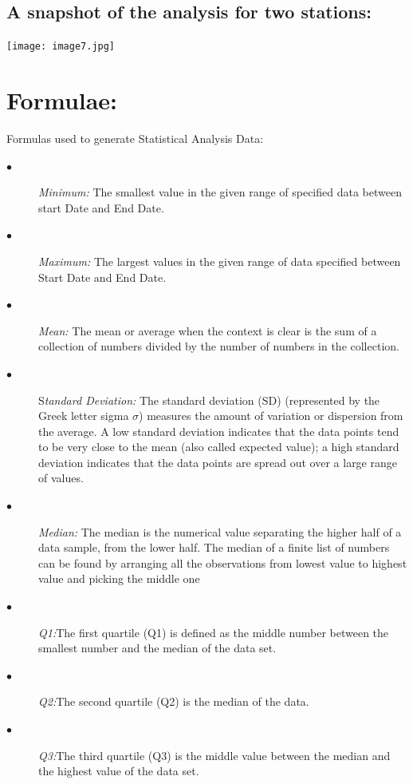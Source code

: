 \documentclass[a4paper]{article}
\begin{document}
\subsection*{A snapshot of the analysis for two stations:}
\begin{center}
\texttt{[image: image7.jpg]}
\end{center}
\begin{minipage}[t]{0.45\textwidth}
\bigskip
\section*{Formulae:}
{\normalsize Formulas used to generate Statistical Analysis Data:
\begin{description}
  \item[$\bullet$ ] \textit{Minimum: }The smallest value in the given range of specified data between start Date and End Date.
  \item[$\bullet$ ] \textit{Maximum: }The largest values in the given range of data specified between Start Date and End Date.
  \item[$\bullet$ ] \textit{Mean:} The mean or average when the context is clear is the sum of a collection of numbers divided by the number of numbers in the collection.
   \item[$\bullet$ ] S\textit{tandard Deviation: }The standard deviation (SD) (represented by the Greek letter sigma $\sigma$) measures the amount of variation or dispersion from the average. A low standard deviation indicates that the data points tend to be very close to the mean (also called expected value); a high standard deviation indicates that the data points are spread out over a large range of values.
   \item[$\bullet$ ]  \textit{Median:} The median is the numerical value separating the higher half of a data sample, from the lower half. The median of a finite list of numbers can be found by arranging all the observations from lowest value to highest value and picking the middle one
    \item[$\bullet$ ]  \textit{Q1:}The first quartile (Q1) is defined as the middle number between the smallest number and the median of the data set.
     \item[$\bullet$ ]  \textit{Q2:}The second quartile (Q2) is the median of the data.
      \item[$\bullet$ ]  \textit{Q3:}The third quartile (Q3) is the middle value between the median and the highest value of the data set.
   \end{description}
   }
   \end{minipage}
   \hspace{.5cm}
\begin{minipage}[t]{0.45\textwidth}
\bigskip
\nocite{*}


\end{minipage}
\end{document}
